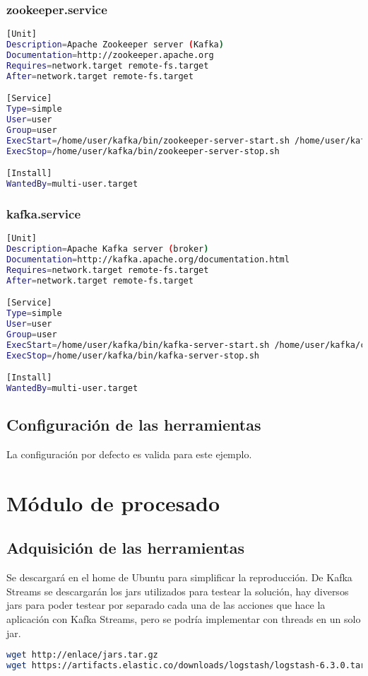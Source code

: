 \subsubsection{zookeeper.service}
\begin{lstlisting}[language=Bash]
[Unit]
Description=Apache Zookeeper server (Kafka)
Documentation=http://zookeeper.apache.org
Requires=network.target remote-fs.target 
After=network.target remote-fs.target

[Service]
Type=simple
User=user
Group=user
ExecStart=/home/user/kafka/bin/zookeeper-server-start.sh /home/user/kafka/config/zookeeper.properties
ExecStop=/home/user/kafka/bin/zookeeper-server-stop.sh

[Install]
WantedBy=multi-user.target
\end{lstlisting}

\subsubsection{kafka.service}
\begin{lstlisting}[language=Bash]
[Unit]
Description=Apache Kafka server (broker)
Documentation=http://kafka.apache.org/documentation.html
Requires=network.target remote-fs.target
After=network.target remote-fs.target

[Service]
Type=simple
User=user
Group=user
ExecStart=/home/user/kafka/bin/kafka-server-start.sh /home/user/kafka/config/server.properties
ExecStop=/home/user/kafka/bin/kafka-server-stop.sh

[Install]
WantedBy=multi-user.target
\end{lstlisting}

\subsection{Configuración de las herramientas}
La configuración por defecto es valida para este ejemplo.


\section{Módulo de procesado}
\subsection{Adquisición de las herramientas}
Se descargará en el home de Ubuntu para simplificar la reproducción. De Kafka Streams se descargarán los jars utilizados para testear la solución, hay diversos jars para poder testear por separado cada una de las acciones que hace la aplicación con Kafka Streams, pero se podría implementar con threads en un solo jar.
\begin{lstlisting}[language=Bash]
wget http://enlace/jars.tar.gz
wget https://artifacts.elastic.co/downloads/logstash/logstash-6.3.0.tar.gz
\end{lstlisting}

